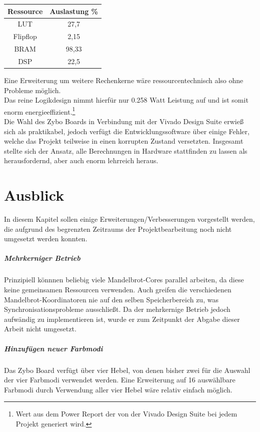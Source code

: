 \documentclass[a4paper,12pt,onesided]{report}
\begin{document}
\begin{table}[H]
	\centering
	\begin{tabular}{|c|c|}
		\hline
		Ressource & Auslastung \% \\ \hline
		LUT & 27,7 \\ \hline
		Flipflop & 2,15 \\ \hline
		BRAM & 98,33 \\ \hline
		DSP & 22,5 \\ \hline
	\end{tabular}
\end{table}

Eine Erweiterung um weitere Rechenkerne wäre ressourcentechnisch also ohne Probleme möglich.\\
Das reine Logikdesign nimmt hierfür nur 0.258 Watt Leistung auf und ist somit enorm energieeffizient.\footnote{Wert aus dem Power Report der von der Vivado Design Suite bei jedem Projekt generiert wird.}\\
Die Wahl des Zybo Boards in Verbindung mit der Vivado Design Suite erwieß sich als praktikabel, jedoch verfügt die Entwicklungssoftware über einige Fehler, welche das Projekt teilweise in einen korrupten Zustand versetzten.
Insgesamt stellte sich der Ansatz, alle Berechnungen in Hardware stattfinden zu lassen als herausfordernd, aber auch enorm lehrreich heraus.


\chapter{Ausblick}
In diesem Kapitel sollen einige Erweiterungen/Verbesserungen vorgestellt werden, die aufgrund des begrenzten Zeitraums der Projektbearbeitung noch nicht umgesetzt werden konnten.

\paragraph{Mehrkerniger Betrieb}
Prinzipiell könnnen beliebig viele Mandelbrot-Cores parallel arbeiten, da diese keine gemeinsamen Ressourcen verwenden. Auch greifen die verschiedenen Mandelbrot-Koordinatoren nie auf den selben Speicherbereich zu, was Synchronisationsprobleme ausschließt. Da der mehrkernige Betrieb jedoch aufwändig zu implementieren ist, wurde er zum Zeitpunkt der Abgabe dieser Arbeit nicht umgesetzt.

\paragraph{Hinzufügen neuer Farbmodi}
Das Zybo Board verfügt über vier Hebel, von denen bisher zwei für die Auswahl der vier Farbmodi verwendet werden. Eine Erweiterung auf 16 auswählbare Farbmodi durch Verwendung aller vier Hebel wäre relativ einfach möglich.
\end{document}
